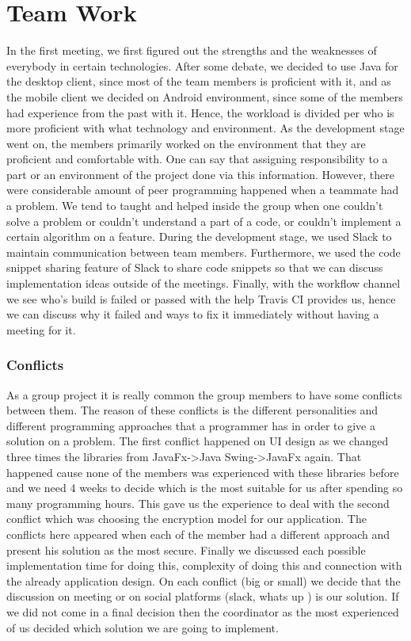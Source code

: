 \documentclass[11pt,a4paper]{report}
\begin{document}
\chapter{Team Work}
In the first meeting, we first figured out the strengths and the weaknesses of everybody in certain technologies. After some debate, we decided to use Java for the desktop client, since most of the team members is proficient with it, and as the mobile client we decided on Android environment, since some of the members had experience from the past with it. Hence, the workload is divided per who is more proficient with what technology and environment. 
As the development stage went on, the members primarily worked on the environment that they are proficient and comfortable with. One can say that assigning responsibility to a part or an environment of the project done via this information. However, there were considerable amount of peer programming happened when a teammate had a problem. We tend to taught and helped inside the group when one couldn’t solve a problem or couldn’t understand a part of a code, or couldn’t implement a certain algorithm on a feature. 
During the development stage, we used Slack to maintain communication between team members. Furthermore, we used the code snippet sharing feature of Slack to share code snippets so that we can discuss implementation ideas outside of the meetings. Finally, with the workflow channel we see who’s build is failed or passed with the help Travis CI provides us, hence we can discuss why it failed and ways to fix it immediately without having a meeting for it. 

\subsection{Conflicts}
As a group project it is really common the group members to have some conflicts between them. The reason of these conflicts is the different personalities and different programming approaches that a programmer has in order to give a solution on a problem. The first conflict happened on UI design as we changed three times the libraries from JavaFx->Java Swing->JavaFx again. That happened cause none of the members was experienced with these libraries before and we need 4 weeks to decide which is the most suitable for us after spending so many programming hours. This gave us the experience to deal with the second conflict which was choosing the encryption model for our application. The conflicts here appeared when each of the member had a different approach and present his solution as the most secure. Finally we discussed each possible implementation time for doing this, complexity of doing this and connection with the already application design. On each conflict (big or small) we decide that the discussion on meeting or on social platforms (slack, whats up ) is our solution. If we did not come in a final decision then the coordinator as the most experienced of us decided which solution we are going to implement.
\end{document}
